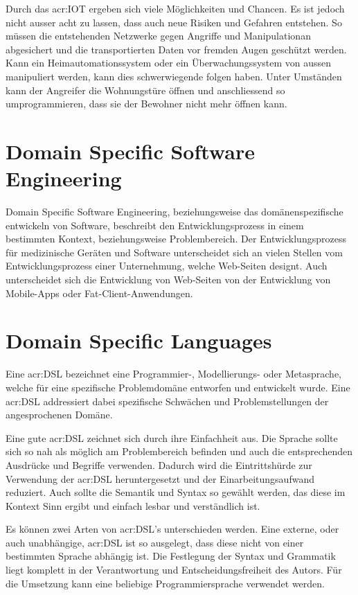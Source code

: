 Durch das \gls{acr:IOT} ergeben sich viele Möglichkeiten und Chancen. Es ist jedoch nicht ausser acht zu lassen, dass auch neue Risiken und Gefahren entstehen. So müssen die entstehenden Netzwerke gegen Angriffe und Manipulationan abgesichert und die transportierten Daten vor fremden Augen geschützt werden. Kann ein Heimautomationssystem oder ein Überwachungssystem von aussen manipuliert werden, kann dies schwerwiegende folgen haben. Unter Umständen kann der Angreifer die Wohnungstüre öffnen und anschliessend so umprogrammieren, dass sie der Bewohner nicht mehr öffnen kann.

\section{Domain Specific Software Engineering}
Domain Specific Software Engineering, beziehungsweise das domänenspezifische entwickeln von Software, beschreibt den Entwicklungsprozess in einem bestimmten Kontext, beziehungsweise Problembereich. Der Entwicklungsprozess für medizinische Geräten und Software unterscheidet sich an vielen Stellen vom Entwicklungsprozess einer Unternehmung, welche Web-Seiten designt. Auch unterscheidet sich die Entwicklung von Web-Seiten von der Entwicklung von Mobile-Apps oder Fat-Client-Anwendungen.

\section{Domain Specific Languages}
Eine \gls{acr:DSL} bezeichnet eine Programmier-, Modellierungs- oder Metasprache, welche für eine spezifische Problemdomäne entworfen und entwickelt wurde. Eine \gls{acr:DSL} addressiert dabei spezifische Schwächen und Problemstellungen der angesprochenen Domäne.

Eine gute \gls{acr:DSL} zeichnet sich durch ihre Einfachheit aus. Die Sprache sollte sich so nah als möglich am Problembereich befinden und auch die entsprechenden Ausdrücke und Begriffe verwenden. Dadurch wird die Eintrittshürde zur Verwendung der \gls{acr:DSL} heruntergesetzt und der Einarbeitungsaufwand reduziert. Auch sollte die Semantik und Syntax so gewählt werden, das diese im Kontext Sinn ergibt und einfach lesbar und verständlich ist.

Es können zwei Arten von \gls{acr:DSL}'s unterschieden werden. Eine externe, oder auch unabhängige, \gls{acr:DSL} ist so ausgelegt, dass diese nicht von einer bestimmten Sprache abhängig ist. Die Festlegung der Syntax und Grammatik liegt komplett in der Verantwortung und Entscheidungsfreiheit des Autors. Für die Umsetzung kann eine beliebige Programmiersprache verwendet werden.

